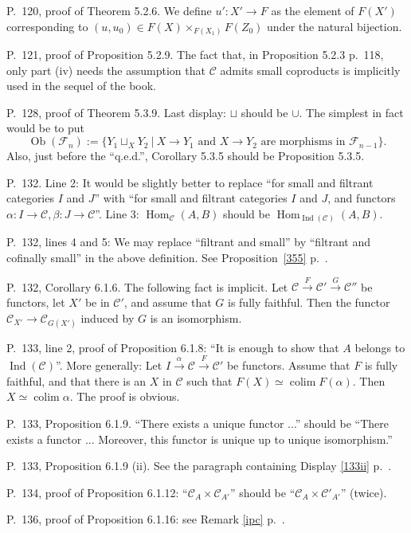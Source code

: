 \documentclass[12pt]{article}
\theoremstyle{remark}
\theoremstyle{definition}
\newcommand{\n}{\noindent}
\newcommand{\C}{\mathcal C}
\newcommand{\F}{\mathcal F}
\newcommand{\pr}{Proposition}
\DeclareMathOperator*{\coli}{colim}
\DeclareMathOperator{\Hom}{Hom}
\DeclareMathOperator{\Ind}{Ind}
\DeclareMathOperator{\Ob}{Ob}
\begin{document}
\n P.~120, proof of Theorem 5.2.6. We define $u':X'\to F$ as the element of $F(X')$ corresponding to $(u,u_0)\in F(X)\times_{F(X_1)}F(Z_0)$ under the natural bijection. 

\n P.~121, proof of Proposition 5.2.9. The fact that, in Proposition 5.2.3 p.~118, only part (iv) needs the assumption that $\C$ admits small coproducts is implicitly used in the sequel of the book. 

\n P.~128, proof of Theorem 5.3.9. Last display: $\sqcup$ should be $\cup$. The simplest in fact would be to put 
$$
\Ob(\F_n):=\{Y_1\sqcup_XY_2\ |\ X\to Y_1\text{ and }X\to Y_2\text{ are morphisms in }\F_{n-1}\}.
$$ 
Also, just before the ``q.e.d.'', Corollary 5.3.5 should be Proposition 5.3.5. 

\n P.~132. Line 2: It would be slightly better to replace ``for small and filtrant categories $I$ and $J$'' with ``for small and filtrant categories $I$ and $J$, and functors $\alpha:I\to\C,\beta:J\to\C$''. Line 3: $\Hom_\C(A,B)$ should be $\Hom_{\Ind(\C)}(A,B)$. 

\n P.~132, lines 4 and 5: \guillemotleft We may replace ``filtrant and small'' by ``filtrant and cofinally small'' in the above definition\guillemotright. See \pr\ \ref{355} p.~\pageref{355}. 

\n P.~132, Corollary 6.1.6. The following fact is implicit. Let $\C\xrightarrow{F}\C'\xrightarrow{G}\C''$ be functors, let $X'$ be in $\C'$, and assume that $G$ is fully faithful. Then the functor $\C_{X'}\to\C_{G(X')}$ induced by $G$ is an isomorphism. 

\n P.~133, line 2, proof of Proposition 6.1.8: ``It is enough to show that $A$ belongs to $\Ind(\C)$''. More generally: Let $I\xrightarrow{\alpha}\C\xrightarrow{F}\C'$ be functors. Assume that $F$ is fully faithful, and that there is an $X$ in $\C$ such that $F(X)\simeq\coli F(\alpha)$. Then $X\simeq\coli\alpha$. The proof is obvious. 

\n P.~133, Proposition 6.1.9. ``There exists a unique functor ...'' should be ``There exists a functor ... Moreover, this functor is unique up to unique isomorphism.'' 

\n P.~133, Proposition 6.1.9 (ii). See the paragraph containing Display \eqref{133ii} p.~\pageref{133ii}. 

\n P.~134, proof of Proposition 6.1.12: ``$\C_A\times\C_{A'}$'' should be ``$\C_A\times\C'_{A'}$'' (twice). 

\n P.~136, proof of Proposition 6.1.16: see Remark \ref{ipc} p.~\pageref{ipc}. 
\end{document}
